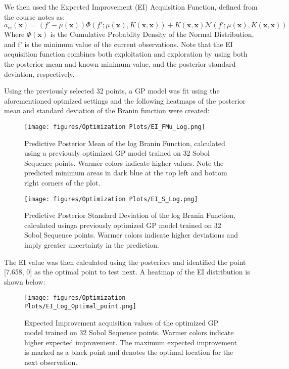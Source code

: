 \documentclass[11pt]{article}
\numberwithin{equation}{section}
\begin{document}
We then used the Expected Improvement (EI) Acquisition Function, defined from the course notes as:
\begin{equation}
  a_{ei}(\bm{x}) = (f' - \mu(\bm{x}))\Phi(f';\mu(\bm{x}),K(\bm{x},\bm{x})) + K(\bm{x},\bm{x})\mathcal{N}(f';\mu(\bm{x}),K(\bm{x},\bm{x}))
  \label{eq:Expected Improvement}
\end{equation}
Where $\Phi(\bm{x})$ is the Cumulative Probablity Density of the Normal Distribution, and f' is the minimum value of the current observations.
Note that the EI acquisition function combines both exploitation and exploration by using both the posterior mean and known minimum value, and the posterior standard deviation, respectively. 

Using the previously selected 32 points, a GP model was fit using the aforementioned optmized settings and the following heatmaps of the posterior mean and standard deviation of the Branin function were created:

\begin{figure}[H]
  \centering
  \texttt{[image: figures/Optimization Plots/EI\_FMu\_Log.png]}
  \caption{Predictive Posterior Mean of the log Branin Function, calculated using a previously optimized GP model trained on 32 Sobol Sequence points. 
  Warmer colors indicate higher values. Note the predicted minimum areas in dark blue at the top left and bottom right corners of the plot.}
  \label{fig:ei-fmu-log}
\end{figure}

\begin{figure}[H]
  \centering
  \texttt{[image: figures/Optimization Plots/EI\_S\_Log.png]}
  \caption{Predictive Posterior Standard Deviation of the log Branin Function, calculated usinga previously optimized GP model trained on 32 Sobol Sequence points. 
  Warmer colors indicate higher deviations and imply greater uncertainty in the prediction.}
  \label{fig:ei-fs-log}
\end{figure}

The EI value was then calculated using the posteriors and identified the point [7.658, 0] as the optimal point to test next. 
A heatmap of the EI distribution is shown below:

\begin{figure}[H]
  \centering
  \texttt{[image: figures/Optimization Plots/EI\_Log\_Optimal\_point.png]}
  \caption{Expected Improvement acquisition values of the optimized GP model trained on 32 Sobol Sequence points. Warmer colors indicate higher expected improvement. 
  The maximum expected improvement is marked as a black point and denotes the optimal location for the next observation.}
  \label{fig:ei-optimalPoint-log}
\end{figure}
\end{document}
